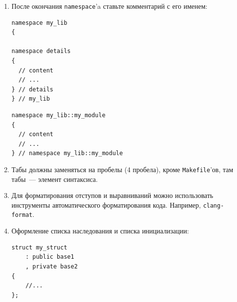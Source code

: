 \documentclass[a4paper,10pt]{article}
\begin{document}
\begin{enumerate}
    \item После окончания {\tt namespace}'a ставьте комментарий с его именем:
        \begin{lstlisting}
namespace my_lib
{

namespace details 
{
  // content
  // ...
} // details 
} // my_lib
        \end{lstlisting}
        \begin{lstlisting}
namespace my_lib::my_module
{
  // content
  // ...
} // namespace my_lib::my_module
        \end{lstlisting}

    \item Табы должны заменяться на пробелы (4 пробела), кроме {\tt Makefile}'ов, там
        табы~— элемент синтаксиса.
    \item Для форматирования отступов и выравниваний можно использовать инструменты автоматического форматирования кода.
        Например, {\tt clang-format}.
    \item Оформление списка наследования и списка инициализации:
        \begin{lstlisting}
struct my_struct
    : public base1
    , private base2
{
    //...
};


\end{lstlisting}
\end{enumerate}
\end{document}
